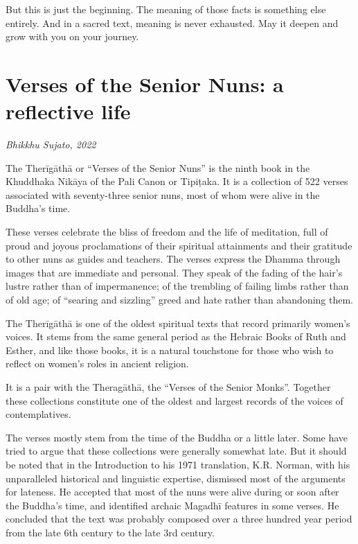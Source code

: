 \documentclass[12pt,openany]{book}%
\newcommand*{\scbyline}[1]{\begin{flushright}\textit{#1}\end{flushright}\bigskip}
\begin{document}
But this is just the beginning. The meaning of those facts is something else entirely. And in a sacred text, meaning is never exhausted. May it deepen and grow with you on your journey. 

%
\chapter*{Verses of the Senior Nuns: a reflective life}

\scbyline{Bhikkhu Sujato, 2022}

The \textsanskrit{Therīgāthā} or “Verses of the Senior Nuns” is the ninth book in the Khuddhaka \textsanskrit{Nikāya} of the Pali Canon or \textsanskrit{Tipiṭaka}. It is a collection of 522 verses associated with seventy-three senior nuns, most of whom were alive in the Buddha’s time.

These verses celebrate the bliss of freedom and the life of meditation, full of proud and joyous proclamations of their spiritual attainments and their gratitude to other nuns as guides and teachers. The verses express the Dhamma through images that are immediate and personal. They speak of the fading of the hair’s lustre rather than of impermanence; of the trembling of failing limbs rather than of old age; of “searing and sizzling” greed and hate rather than abandoning them.

The \textsanskrit{Therīgāthā} is one of the oldest spiritual texts that record primarily women’s voices. It stems from the same general period as the Hebraic Books of Ruth and Esther, and like those books, it is a natural touchstone for those who wish to reflect on women’s roles in ancient religion.

It is a pair with the \textsanskrit{Theragāthā}, the “Verses of the Senior Monks”. Together these collections constitute one of the oldest and largest records of the voices of contemplatives.

The verses mostly stem from the time of the Buddha or a little later. Some have tried to argue that these collections were generally somewhat late. But it should be noted that in the Introduction to his 1971 translation, K.R. Norman, with his unparalleled historical and linguistic expertise, dismissed most of the arguments for lateness. He accepted that most of the nuns were alive during or soon after the Buddha’s time, and identified archaic \textsanskrit{Magadhī} features in some verses. He concluded that the text was probably composed over a three hundred year period from the late 6th century to the late 3rd century.
\end{document}
